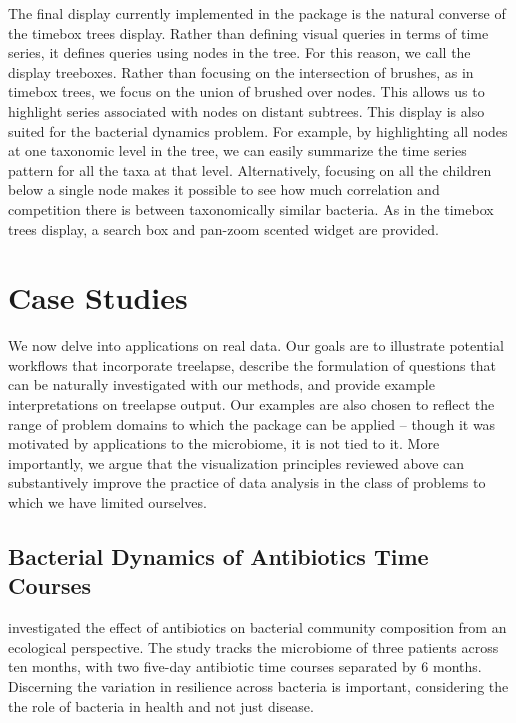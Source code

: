 \documentclass[12pt]{article}
\begin{document}
The final display currently implemented in the package is the natural
converse of the timebox trees display. Rather than defining visual
queries in terms of time series, it defines queries using nodes in the
tree. For this reason, we call the display treeboxes. Rather than
focusing on the intersection of brushes, as in timebox trees, we focus
on the union of brushed over nodes. This allows us to highlight series
associated with nodes on distant subtrees. This display is also suited
for the bacterial dynamics problem. For example, by highlighting all
nodes at one taxonomic level in the tree, we can easily summarize the
time series pattern for all the taxa at that level. Alternatively,
focusing on all the children below a single node makes it possible to
see how much correlation and competition there is between taxonomically
similar bacteria. As in the timebox trees display, a search box and
pan-zoom scented widget are provided.

\section{Case Studies}\label{case-studies}

We now delve into applications on real data. Our goals are to illustrate
potential workflows that incorporate treelapse, describe the formulation
of questions that can be naturally investigated with our methods, and
provide example interpretations on treelapse output. Our examples are
also chosen to reflect the range of problem domains to which the package
can be applied -- though it was motivated by applications to the
microbiome, it is not tied to it. More importantly, we argue that the
visualization principles reviewed above can substantively improve the
practice of data analysis in the class of problems to which we have
limited ourselves.

\subsection{Bacterial Dynamics of Antibiotics Time
Courses}\label{bacterial-dynamics-of-antibiotics-time-courses}

\citet{dethlefsen2008pervasive} investigated the
effect of antibiotics on bacterial community composition from an
ecological perspective. The study tracks the microbiome of three
patients across ten months, with two five-day antibiotic time courses
separated by 6 months. Discerning the variation in resilience across
bacteria is important, considering the the role of bacteria in health
and not just disease.
\end{document}
